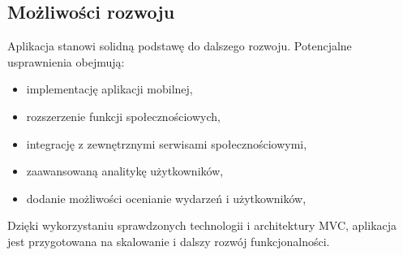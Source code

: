 \documentclass[12pt,a4paper]{article}
\begin{document}
\subsection{Możliwości rozwoju}

Aplikacja stanowi solidną podstawę do dalszego rozwoju. Potencjalne usprawnienia obejmują:
\begin{itemize}[itemsep=2pt]
    \item implementację aplikacji mobilnej,
    \item rozszerzenie funkcji społecznościowych,
    \item integrację z zewnętrznymi serwisami społecznościowymi,
    \item zaawansowaną analitykę użytkowników,
    \item dodanie możliwości ocenianie wydarzeń i użytkowników,
\end{itemize}

Dzięki wykorzystaniu sprawdzonych technologii i architektury MVC, aplikacja jest przygotowana na skalowanie i dalszy rozwój funkcjonalności.

\newpage
\listoffigures

\newpage
\renewcommand{\lstlistlistingname}{Spis kodów źródłowych}
\lstlistoflistings
\end{document}
